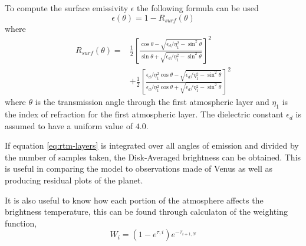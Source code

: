 To compute the surface emissivity $\epsilon$ the following formula can be used
\begin{equation}\label{eq:rtm-esurf}
\epsilon(\theta) = 1-R_{surf}(\theta)
\end{equation}
where
\begin{equation}\label{eq:rtm-rsurf}
\begin{split}
R_{surf}(\theta) =& \frac{1}{2} \left[ \frac{\cos\theta - \sqrt{\epsilon_d/\eta_1^2-\sin^2\theta}}{\sin\theta + \sqrt{\epsilon_d/\eta_1^2-\sin^2\theta}} \right]^2\\
&+\frac{1}{2} \left[ \frac{\epsilon_d/\eta_1^2 \cos\theta - \sqrt{\epsilon_d/\eta_1^2-\sin^2\theta}}{\epsilon_d/\eta_1^2 \cos\theta + \sqrt{\epsilon_d/\eta_1^2-\sin^2\theta}} \right]^2
\end{split}
\end{equation}
where $\theta$ is the transmission angle through the first atmospheric layer and $\eta_1$ is the index of refraction for the first atmospheric layer. The dielectric constant $\epsilon_d$ is assumed to have a uniform value of $4.0$.

If equation \ref{eq:rtm-layers} is integrated over all angles of emission and divided by the number of samples taken, the Disk-Averaged brightness can be obtained. This is useful in comparing the model to observations made of Venus as well as producing residual plots of the planet.

It is also useful to know how each portion of the atmosphere affects the brightness temperature, this can be found through calculaton of the weighting function,
\begin{equation}
W_i = (1-e^{\tau,i}) e^{-\tau_{i+1,N}}
\end{equation}











